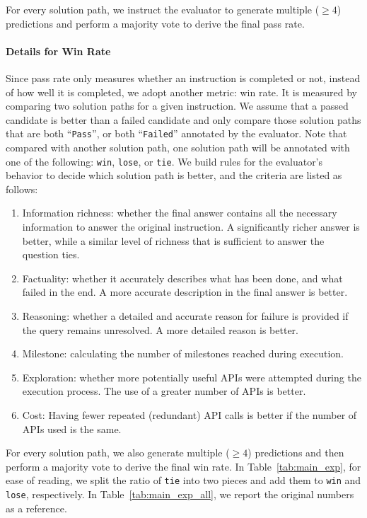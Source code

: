 For every solution path, we instruct the \turbo evaluator to generate multiple ($\ge 4$) predictions and perform a majority vote to derive the final pass rate.

\paragraph{Details for Win Rate}

Since pass rate only measures whether an instruction is completed or not, instead of how well it is completed, we adopt another metric: win rate. It is measured by comparing two solution paths for a given instruction. We assume that a passed candidate is better than a failed candidate and only compare those solution paths that are both ``\texttt{Pass}'', or both ``\texttt{Failed}'' annotated by the \turbo evaluator. Note that compared with another solution path, one solution path will be annotated with one of the following: \texttt{win}, \texttt{lose}, or \texttt{tie}. We build rules for the evaluator's behavior to decide which solution path is better, and the criteria are listed as follows:
\begin{enumerate}
    \item Information richness: whether the final answer contains all the necessary information to answer the original instruction. A significantly richer answer is better, while a similar level of richness that is sufficient to answer the question ties.
    \item Factuality: whether it accurately describes what has been done, and what failed in the end. A more accurate description in the final answer is better.
    \item Reasoning: whether a detailed and accurate reason for failure is provided if the query remains unresolved. A more detailed reason is better.
    \item Milestone: calculating the number of milestones reached during execution.
    \item  Exploration: whether more potentially useful APIs were attempted during the execution process. The use of a greater number of APIs is better.
    \item Cost: Having fewer repeated (redundant) API calls is better if the number of APIs used is the same.
\end{enumerate}

For every solution path, we also generate multiple ($\ge 4$) predictions and then perform a majority vote to derive the final win rate. In Table~\ref{tab:main_exp}, for ease of reading, we split the ratio of \texttt{tie} into two pieces and add them to \texttt{win} and \texttt{lose}, respectively. In Table~\ref{tab:main_exp_all}, we report the original numbers as a reference.

